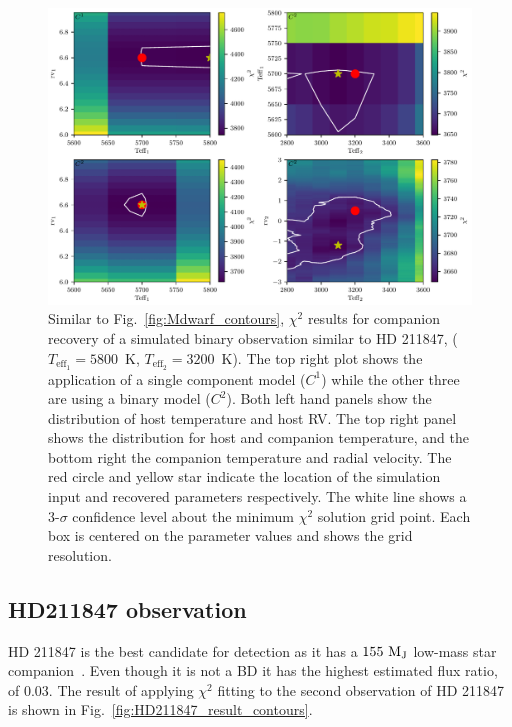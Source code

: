 \documentclass[fleqn,usenatbib]{mnras}
\begin{document}
\begin{figure}
    \centering
    \includegraphics[width=\hsize]{images/HD211847_example_pcolors.pdf}
    \caption{Similar to Fig.~\ref{fig:Mdwarf_contours}, \(\chi^2\) results for companion recovery of a simulated binary observation similar to {HD 211847}, (\(T_{\textrm{eff}_1} = 5800\)~K, \(T_{\textrm{eff}_2}=3200\)~K). The top right plot shows the application of a single component model (\(C^1\)) while the other three are using a binary model (\(C^2\)). Both left hand panels show the distribution of host temperature and host RV. The top right panel shows the distribution for host and companion temperature, and the bottom right the companion temperature and radial velocity.
        The red circle and yellow star indicate the location of the simulation input and recovered parameters respectively.
        The white line shows a 3-\(\sigma\) confidence level about the minimum \(\chi^2\) solution grid point. Each box is centered on the parameter values and shows the grid resolution.}
    \label{fig:HD211847_simulated_contours}
\end{figure}


\subsection{HD211847 observation}
\label{subsection:results-hd211847}
{HD 211847} is the best candidate for detection as it has a \(\rm 155~M_J\) low-mass star companion~\citet{moutou_eccentricity_2017}. Even though it is not a BD it has the highest estimated flux ratio, of 0.03. The result of applying \(\chi^2\) fitting to the second observation of {HD 211847} is shown in Fig.~\ref{fig:HD211847_result_contours}.
\end{document}
